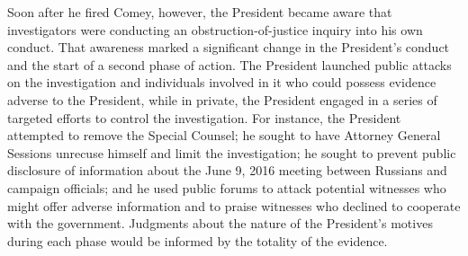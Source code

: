 Soon after he fired Comey, however, the President became aware that investigators were conducting an obstruction-of-justice inquiry into his own conduct.
That awareness marked a significant change in the President's conduct and the start of a second phase of action.
The President launched public attacks on the investigation and individuals involved in it who could possess evidence adverse to the President, while in private, the President engaged in a series of targeted efforts to control the investigation.
For instance, the President attempted to remove the Special Counsel; he sought to have Attorney General Sessions unrecuse himself and limit the investigation; he sought to prevent public disclosure of information about the June 9, 2016 meeting between Russians and campaign officials; and he used public forums to attack potential witnesses who might offer adverse information and to praise witnesses who declined to cooperate with the government.
Judgments about the nature of the President's motives during each phase would be informed by the totality of the evidence.
